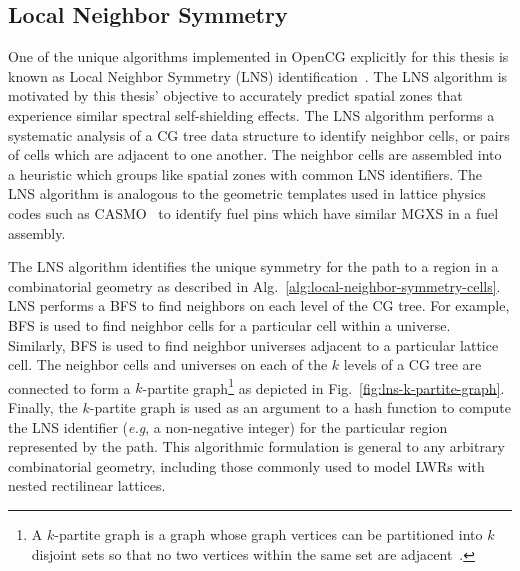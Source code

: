 

\subsection{Local Neighbor Symmetry}
\label{sec:chap4-lns}

One of the unique algorithms implemented in OpenCG explicitly for this thesis is known as Local Neighbor Symmetry (LNS) identification~\cite{boyd2015opencg}. The LNS algorithm is motivated by this thesis' objective to accurately predict spatial zones that experience similar spectral self-shielding effects. The \ac{LNS} algorithm performs a systematic analysis of a \ac{CG} tree data structure to identify neighbor cells, or pairs of cells which are adjacent to one another. The neighbor cells are assembled into a heuristic which groups like spatial zones with common \ac{LNS} identifiers. The \ac{LNS} algorithm is analogous to the geometric templates used in lattice physics codes such as CASMO~\cite{edenius1995casmo} to identify fuel pins which have similar \ac{MGXS} in a fuel assembly.

The \ac{LNS} algorithm identifies the unique symmetry for the path to a region in a combinatorial geometry as described in Alg.~\ref{alg:local-neighbor-symmetry-cells}. \ac{LNS} performs a \ac{BFS} to find neighbors on each level of the \ac{CG} tree. For example, \ac{BFS} is used to find neighbor cells for a particular cell within a universe. Similarly, \ac{BFS} is used to find neighbor universes adjacent to a particular lattice cell. The neighbor cells and universes on each of the $k$ levels of a \ac{CG} tree are connected to form a $k$-partite graph\footnote{A $k$-partite graph is a graph whose graph vertices can be partitioned into $k$ disjoint sets so that no two vertices within the same set are adjacent~\cite{weisstein2012kpartite}.} as depicted in Fig.~\ref{fig:lns-k-partite-graph}. Finally, the $k$-partite graph is used as an argument to a hash function to compute the \ac{LNS} identifier (\textit{e.g}, a non-negative integer) for the particular region represented by the path. This algorithmic formulation is general to any arbitrary combinatorial geometry, including those commonly used to model \ac{LWRs} with nested rectilinear lattices.

